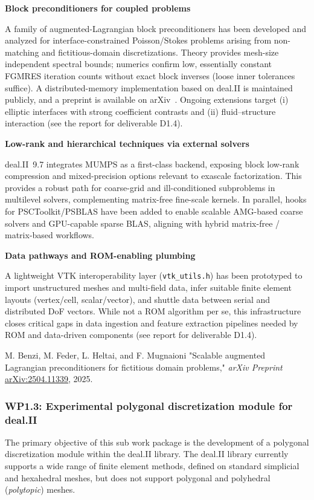 \documentclass[a4paper,12pt, numbers]{article}
\begin{document}
\noindent\textbf{Block preconditioners for coupled problems}

A family of augmented-Lagrangian block preconditioners has been developed and
analyzed for interface-constrained Poisson/Stokes problems arising from
non-matching and fictitious-domain discretizations. Theory provides mesh-size
independent spectral bounds; numerics confirm low, essentially constant FGMRES
iteration counts without exact block inverses (loose inner tolerances suffice).
A distributed-memory implementation based on deal.II is maintained publicly, and
a preprint is available on arXiv~\cite{ALprec}. Ongoing extensions target (i) elliptic
interfaces with strong coefficient contrasts and (ii) fluid–struc\-ture
interaction (see the report for deliverable D1.4).

\noindent\textbf{Low-rank and hierarchical techniques via external solvers}

deal.II~9.7 integrates MUMPS as a first-class backend, exposing block low-rank
compression and mixed-precision options relevant to exascale factorization.
This provides a robust path for coarse-grid and ill-conditioned subproblems in
multilevel solvers, complementing matrix-free fine-scale kernels. In parallel,
hooks for PSCToolkit/PSBLAS have been added to enable scalable AMG-based
coarse solvers and GPU-capable sparse BLAS, aligning with hybrid matrix-free /
matrix-based workflows.

\noindent\textbf{Data pathways and ROM-enabling plumbing}

A lightweight VTK interoperability layer (\texttt{vtk\_utils.h}) has been
prototyped to import unstructured meshes and multi-field data, infer suitable
finite element layouts (vertex/cell, scalar/vector), and shuttle data between
serial and distributed DoF vectors. While not a ROM algorithm per se, this
infrastructure closes critical gaps in data ingestion and feature extraction
pipelines needed by ROM and data-driven components (see report for deliverable
D1.4).

\begin{thebibliography}{10}
 M. Benzi, M. Feder, L. Heltai, and F. Mugnaioni "Scalable augmented Lagrangian preconditioners for fictitious domain problems," \emph{arXiv Preprint} \href{https://arxiv.org/abs/2504.11339}{arXiv:2504.11339}, 2025.
\end{thebibliography}

\subsubsection*{WP1.3: Experimental polygonal discretization module for deal.II} %
The primary objective of this sub work package is the development of a polygonal
discretization module within the deal.II library. The deal.II library currently
supports a wide range of finite element methods, defined on standard simplicial
and hexahedral meshes, but does not support polygonal and polyhedral (\emph{polytopic}) meshes.
\end{document}
